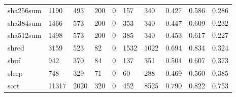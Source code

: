 \begin{longtable}{lp{2.0cm}p{2.0cm}p{2.0cm}p{2.0cm}p{2.0cm}p{2.0cm}p{2.0cm}p{2.0cm}p{2.0cm}}
sha256sum &                   1190 &                                493 &                               200 &                                0 &                               157 &                             340 &                                0.427 &                                  0.586 &                                0.286 \\
sha384sum &                   1466 &                                573 &                               200 &                                0 &                               353 &                             340 &                                0.447 &                                  0.609 &                                0.232 \\
sha512sum &                   1498 &                                573 &                               200 &                                0 &                               385 &                             340 &                                0.453 &                                  0.617 &                                0.227 \\
shred     &                   3159 &                                523 &                                82 &                                0 &                              1532 &                            1022 &                                0.694 &                                  0.834 &                                0.324 \\
shuf      &                    942 &                                370 &                                84 &                                0 &                               137 &                             351 &                                0.504 &                                  0.607 &                                0.373 \\
sleep     &                    748 &                                329 &                                71 &                                0 &                                60 &                             288 &                                0.469 &                                  0.560 &                                0.385 \\
sort      &                  11317 &                               2020 &                               320 &                                0 &                               452 &                            8525 &                                0.790 &                                  0.822 &                                0.753 \\

\end{longtable}
